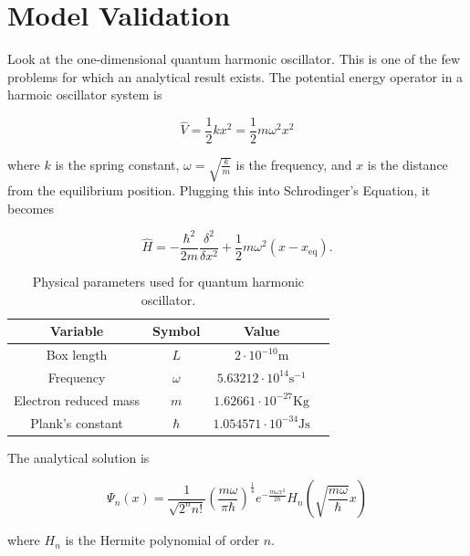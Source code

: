 \documentclass[12pt, a4paper, twocolumn]{article}
\begin{document}
\section{Model Validation}
\label{sec:modval}

Look at the one-dimensional quantum harmonic oscillator. This is one of the few problems for which an analytical result exists. The potential energy operator in a harmoic oscillator system is 

\begin{equation}
\hat{V} = \frac{1}{2}kx^2=\frac{1}{2}m\omega^2x^2
\end{equation}

where $k$ is the spring constant, $\omega = \sqrt{\frac{k}{m}}$ is the frequency, and $x$ is the distance from the equilibrium position. Plugging this into Schrodinger's Equation, it becomes

\begin{equation}
\hat{H} = -\frac{\hbar^2}{2m} \frac{\delta^2}{\delta x^2} +\frac{1}{2}m\omega ^2 (x-x_{\mathrm{eq}}).
\end{equation}

\begin{table}[t]\footnotesize
	\centering
	\caption{Physical parameters used for quantum harmonic oscillator.}
	\begin{tabular}{| c | c | c | c |}
	\hline
    Variable & Symbol & Value \\
    \hline 
    Box length & $L$ & $2\cdot 10^{-10} \mathrm{m}$ \\
    \hline 
    Frequency & $\omega$ & $5.63212\cdot 10^{14} \mathrm{s}^{-1}$ \\
    \hline 
    Electron reduced mass & $m$ & $1.62661\cdot 10^{-27} \mathrm{Kg}$ \\
    \hline 
    Plank's constant & $\hbar$ & $1.054571\cdot 10^{-34} \mathrm{Js}$ \\
    \hline
  \end{tabular}
\label{tab:physparam}
\end{table}

The analytical solution is

\begin{equation}
\Psi_n(x) = \frac{1}{\sqrt{2^n n!}} \left( \frac{m \omega}{\pi \hbar} \right)^{\frac{1}{4}} e^{ -\frac{m\omega x^2}{2\hbar} }H_n \left( \sqrt{\frac{m \omega}{\hbar}}x \right)
\end{equation}

where $H_n$ is the Hermite polynomial of order $n$.
\end{document}
